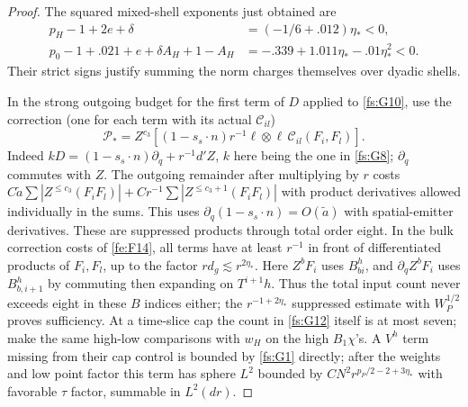 \begin{proof}
The squared mixed-shell exponents just obtained are
\begin{equation}
\label{fs:quadratic-shell-margins}
 \begin{split}
 p_H-1+2e+\delta&=(-1/6+.012)\eta_*<0,\\
 p_0-1+.021+e+\delta A_H+1-A_H
   &=-.339+1.011\eta_*-.01\eta_*^2<0 .
 \end{split}
\end{equation}
Their strict signs justify summing the norm charges themselves
over dyadic shells.

In the strong outgoing budget for the first term of \(D\) applied to \eqref{fs:G10}, use the correction (one for each term with its actual \(\mathcal C_{il}\))
\begin{equation}
\label{fs:G12}
\mathcal P_*= Z^{c_3}\!\left[
           (1-s_s\cdot n)r^{-1}\ell\otimes\ell\,\mathcal C_{il}(F_i,F_l)
                              \right].
\end{equation}
Indeed \(kD=(1-s_s\cdot n)\partial_q+r^{-1}d' Z\), \(k\) here being the one in \eqref{fs:G8}; \(\partial_q\) commutes with \(Z\). The outgoing remainder after multiplying by \(r\) costs
\(C\widetilde a \sum|Z^{\le c_3}(F_i F_l)|+C r^{-1}\sum|Z^{\le c_3+1}(F_i F_l)|\)
with product derivatives allowed individually in the sums. This uses \(\partial_q(1-s_s\cdot n)=O(\widetilde a)\) with spatial-emitter derivatives. These are suppressed products through total order eight. In the bulk correction costs of \eqref{fe:F14}, all terms have at least \(r^{-1}\) in front of differentiated products of \(F_i,F_l\), up to the factor \(r d_g\lesssim r^{2\eta_*}\). Here \(Z^b F_i\) uses \(B^h_{b i}\), and \(\partial_q Z^b F_i\) uses \(B^h_{b,i+1}\) by commuting then expanding on \(T^{i+1}h\). Thus the total input count never exceeds eight in these \(B\) indices either; the \(r^{-1+2\eta_*}\) suppressed estimate with \(W_P^{1/2}\) proves sufficiency. At a time-slice cap the count in \eqref{fs:G12} itself is at most seven; make the same high-low comparisons with \(w_H\) on the high \(B_1\chi\)'s. A \(V^h\) term missing from their cap control is bounded by \eqref{fs:G1} directly; after the weights and low point factor this term has sphere \(L^2\) bounded by \(C N^2 r^{p_P/2-2+3\eta_*}\) with favorable \(\tau\) factor, summable in \(L^2(dr)\).


\end{proof}
